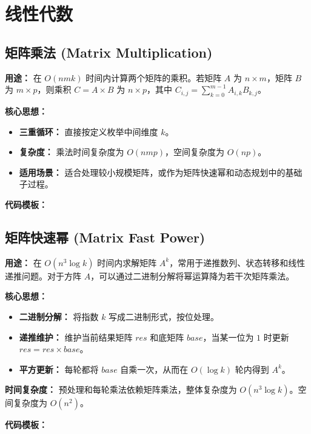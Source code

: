 \section{线性代数}


\subsection{矩阵乘法 (Matrix Multiplication)}

\textbf{用途：}
在 $O(nmk)$ 时间内计算两个矩阵的乘积。若矩阵 $A$ 为 $n \times m$，矩阵 $B$ 为 $m \times p$，则乘积 $C = A \times B$ 为 $n \times p$，其中
$C_{i,j} = \sum_{k=0}^{m-1} A_{i,k} B_{k,j}$。

\textbf{核心思想：}
\begin{itemize}
    \item \textbf{三重循环：} 直接按定义枚举中间维度 $k$。
    \item \textbf{复杂度：} 乘法时间复杂度为 $O(nmp)$，空间复杂度为 $O(np)$。
    \item \textbf{适用场景：} 适合处理较小规模矩阵，或作为矩阵快速幂和动态规划中的基础子过程。
\end{itemize}

\textbf{代码模板：}



\subsection{矩阵快速幂 (Matrix Fast Power)}

\textbf{用途：}
在 $O(n^3 \log k)$ 时间内求解矩阵 $A^k$，常用于递推数列、状态转移和线性递推问题。对于方阵 $A$，可以通过二进制分解将幂运算降为若干次矩阵乘法。

\textbf{核心思想：}
\begin{itemize}
    \item \textbf{二进制分解：} 将指数 $k$ 写成二进制形式，按位处理。
    \item \textbf{递推维护：} 维护当前结果矩阵 $res$ 和底矩阵 $base$，当某一位为 $1$ 时更新 $res = res \times base$。
    \item \textbf{平方更新：} 每轮都将 $base$ 自乘一次，从而在 $O(\log k)$ 轮内得到 $A^k$。
\end{itemize}

\textbf{时间复杂度：} 预处理和每轮乘法依赖矩阵乘法，整体复杂度为 $O(n^3 \log k)$。空间复杂度为 $O(n^2)$。

\textbf{代码模板：}

